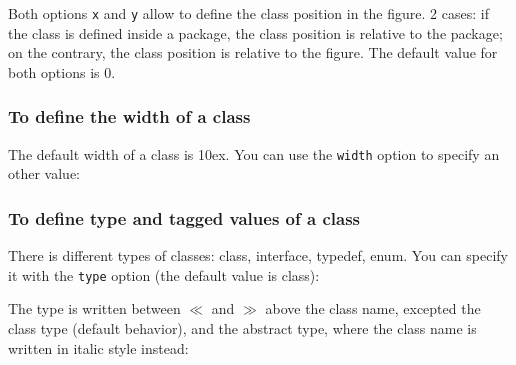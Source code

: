 \documentclass[a4paper,11pt]{report}
\begin{document}
\medskip

Both options {\tt x} and {\tt y} allow to define the class position in the figure. 2 cases: 
if the class is defined inside a package, the class position is relative to the package; 
on the contrary, the class position is relative to the figure. The default value for both options is 0.

\subsubsection{To define the width of a class}\label{ss.classwidth}

The default width of a class is 10ex. You can use the {\tt width} option to specify an other value:

\medskip

\begin{minipage}{0.5\textwidth}

\end{minipage}
\begin{minipage}{0.4\textwidth}
\begin{center}
\end{center}
\end{minipage}

\subsubsection{To define type and tagged values of a class}\label{ss.classtype}

There is different types of classes: class, interface, typedef, enum. You can specify it with the {\tt type} option (the default value is class):

\medskip

\begin{minipage}{0.5\textwidth}

\end{minipage}
\begin{minipage}{0.4\textwidth}
\begin{center}
\end{center}
\end{minipage}

\medskip

\begin{remark}
The type is written between $\ll$ and $\gg$ above the class name, excepted the class type (default behavior), and the abstract type, where the class name is written in italic style instead:
\end{remark}
\end{document}
